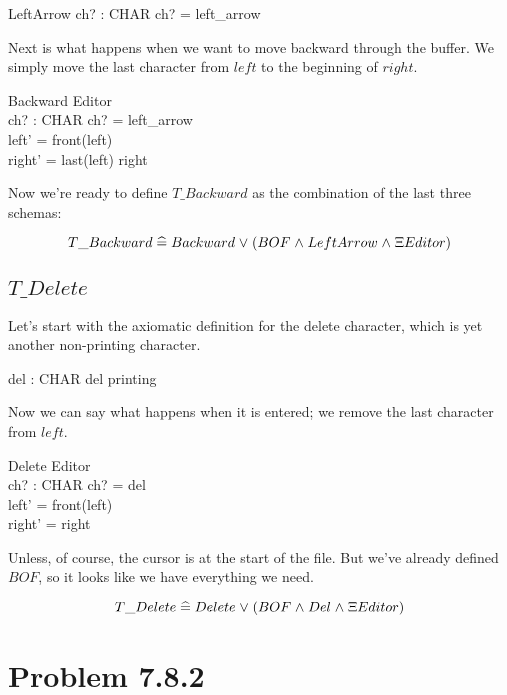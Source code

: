 \documentclass[11pt]{article}
\begin{document}
\begin{schema}{LeftArrow}
  ch? : CHAR
  \where
  ch? = left\_arrow
\end{schema}

Next is what happens when we want to move backward through the buffer.  We simply move the last
character from $left$ to the beginning of $right$.

\begin{schema}{Backward}
  \Delta Editor \\
  ch? : CHAR
  \where
  ch? = left\_arrow \\
  left' = front(left) \\
  right' = \langle last(left) \rangle \cat right
\end{schema}

Now we're ready to define $T\_Backward$ as the combination of the last three schemas:

\[ T\_Backward \mathrel{\widehat=} Backward \mathrel{\vee} (BOF \mathrel{\wedge} LeftArrow \mathrel{\wedge} \Xi Editor) \]

\subsection{$T\_Delete$}

Let's start with the axiomatic definition for the delete character, which is yet another
non-printing character.

\begin{axdef}
  del : CHAR
  \where
  del \notin printing
\end{axdef}

Now we can say what happens when it is entered; we remove the last character from $left$.

\begin{schema}{Delete}
  \Delta Editor \\
  ch? : CHAR
  \where
  ch? = del \\
  left' = front(left) \\
  right' = right
\end{schema}

Unless, of course, the cursor is at the start of the file.  But we've already defined $BOF$, so it
looks like we have everything we need.

\[ T\_Delete \mathrel{\widehat=} Delete \mathrel{\vee} (BOF \mathrel{\wedge} Del \mathrel{\wedge} \Xi Editor) \]

\section{Problem 7.8.2}
\end{document}
